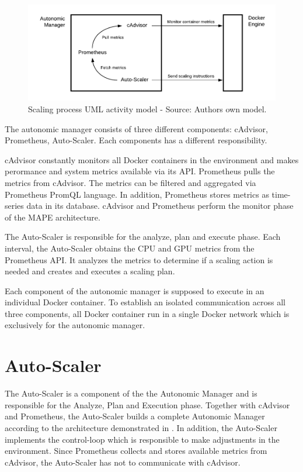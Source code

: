 \begin{figure}[h]%
\centering
\includegraphics[scale=0.85]{images/04_conceptual_design/autonomic_manager/autonomic_manager_overview}%
\caption{Scaling process UML activity model - Source: Authors own model.}%
\label{fig:am-design-component}%
\end{figure}

The autonomic manager consists of three different components: cAdvisor, Prometheus, Auto-Scaler. Each components has a different responsibility. 


cAdvisor constantly monitors all Docker containers in the environment and makes perormance and system metrics available via its API.
Prometheus pulls the metrics from cAdvisor. The metrics can be filtered and aggregated via Prometheus PromQL language. In addition, Prometheus stores metrics as time-series data in its database.
cAdvisor and Prometheus perform the monitor phase of the MAPE architecture.


The Auto-Scaler is responsible for the analyze, plan and execute phase. Each interval, the Auto-Scaler obtains the CPU and GPU metrics from the Prometheus API. It analyzes the metrics to determine if a scaling action is needed and creates and executes a scaling plan.


Each component of the autonomic manager is supposed to execute in an individual Docker container. To establish an isolated communication across all three components, all Docker container run in a single Docker network which is exclusively for the autonomic manager.


\section{Auto-Scaler}
The Auto-Scaler is a component of the the Autonomic Manager and is responsible for the Analyze, Plan and Execution phase.
Together with cAdvisor and Prometheus, the Auto-Scaler builds a complete Autonomic Manager according to the architecture demonstrated in .
In addition, the Auto-Scaler implements the control-loop which is responsible to make adjustments in the environment.
Since Prometheus collects and stores available metrics from cAdvisor, the Auto-Scaler has not to communicate with cAdvisor.

